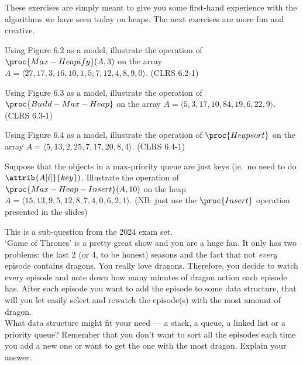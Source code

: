 \documentclass{article}
\begin{document}
\thispagestyle{fancy}

\begin{Exercise}[title={Typing some traces}]

    \ExeText
    \noindent
    These exercises are simply meant to give you some first-hand experience with
    the algorithms we have seen today on heaps. The next exercises are more fun
    and creative.

    \Question
    Using Figure 6.2 as a model, illustrate the operation of
    $\proc{Max-Heapify}(A,3)$ on the array $A = \langle 27, 17, 3, 16, 10, 1, 5,
    7, 12, 4, 8, 9, 0 \rangle$. (CLRS 6.2-1)

    \Question
    Using Figure 6.3 as a model, illustrate the operation of
    $\proc{Build-Max-Heap}$ on the array $A = \langle 5, 3, 17, 10, 84, 19, 6,
    22, 9 \rangle$. (CLRS 6.3-1)

    \Question
    Using Figure 6.4 as a model, illustrate the operation of $\proc{Heapsort}$
    on the array $A = \langle 5, 13, 2, 25, 7, 17, 20, 8, 4 \rangle$. (CLRS
    6.4-1)

    \Question
    Suppose that the objects in a max-priority queue are just keys (ie.\ no need
    to do $\attrib{A[i]}{key})$. Illustrate the operation of
    $\proc{Max-Heap-Insert}(A,10)$ on the heap $A = \langle 15, 13, 9, 5, 12, 8,
    7, 4, 0, 6, 2, 1 \rangle$. (NB: just use the $\proc{Insert}$ operation
    presented in the slides)

\end{Exercise}

\begin{Exercise}[title={Exam question}]
    \noindent
    This is a sub-question from the 2024 exam set. \\

    \ExeText
    \noindent
    `Game of Thrones' is a pretty great show and you are a huge fan.  It only
    has two problems: the last 2 (or 4, to be honest) seasons and the fact that
    not \textit{every} episode contains dragons. You really love dragons.
    Therefore, you decide to watch every episode and note down how many minutes
    of dragon action each episode has. After each episode you want to add the
    episode to some data structure, that will you let easily select and rewatch
    the episode(s) with the most amount of dragon. \\

    \Question
    What data structure might fit your need --- a stack, a queue, a linked list
    or a priority queue? Remember that you don't want to sort all the episodes
    each time you add a new one or want to get the one with the most dragon.
    Explain your answer.

\end{Exercise}
\end{document}
